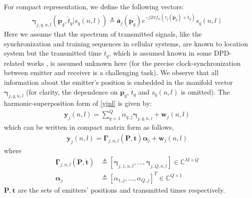\documentclass[review]{elsarticle}
\begin{document}
For compact representation, we define the following vectors:
\begin{align}\label{gamma}
    \boldsymbol{\gamma}_{j,q,n,l}(\boldsymbol{p}_q,\mathring{t}_q\vert s_q(n,l))\triangleq\boldsymbol{a}_j(\boldsymbol{p}_q)e^{-j2\pi f_n(\tau_j(\boldsymbol{p}_q)+\mathring{t}_q)}s_q(n,l)
\end{align}
Here we assume that the spectrum of transmitted signals, like the synchronization and training sequences in cellular systems, are known to location system but the transmitted time $\mathring{t}_q$, which is assumed known in some DPD-related works \cite{DPD2005,2006Efficient}, is assumed unknown here (for the precise clock-synchronization between emitter and receiver is a challenging task). We observe that all information about the emitter's position is embedded in the manifold vector $\boldsymbol{\gamma}_{j,q,n,l}$ (for clarity, the dependence on $\boldsymbol{p}_q$, $\mathring{t}_q$ and $s_q(n,l)$ is omitted). The harmonic-superposition form of \eqref{yjnl} is given by:
\begin{align}\label{yjnl2}
    \boldsymbol{y}_j(n,l)=\sum_{q=1}^Q\alpha_{q,j}\boldsymbol{\gamma}_{j,q,n,l}+\boldsymbol{w}_j(n,l)
\end{align}
which can be written in compact matrix form as follows,
\begin{align}
    \boldsymbol{y}_j(n,l)=\boldsymbol{\Gamma}_{j,n,l}(\boldsymbol{P},\mathring{\boldsymbol{t}})\boldsymbol{\alpha}_j+\boldsymbol{w}_j(n,l)
\end{align}
where  
\begin{align}\label{Gammajnl}
    \boldsymbol{\Gamma}_{j,n,l}(\boldsymbol{P},\mathring{\boldsymbol{t}})&\triangleq[\boldsymbol{\gamma}_{j,1,n,l},...,\boldsymbol{\gamma}_{j,Q,n,l}]\in \mathbb{C}^{M\times Q}\\ \nonumber
    \boldsymbol{\alpha}_j&\triangleq[\alpha_{1,j},...,\alpha_{Q,j}]^T\in \mathbb{C}^{Q\times 1} 
\end{align}
$\boldsymbol{P},\mathring{\boldsymbol{t}}$ are the sets of emitters' positions and transmitted times respectively.
\end{document}
